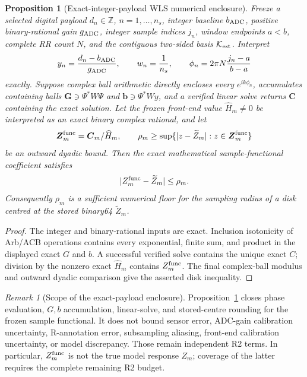 \documentclass[11pt]{article}
\newtheorem{proposition}[theorem]{Proposition}
\theoremstyle{definition}
\theoremstyle{remark}
\newtheorem{remark}[theorem]{Remark}
\newcommand{\Kset}{\mathcal K_{\rm est}}
\begin{document}
\begin{proposition}[Exact-integer-payload WLS numerical enclosure]
\label{prop:exact-payload-wls}
Freeze a selected digital payload \(d_n\in\mathbb Z\),
\(n=1,\ldots,n_s\), integer baseline
\(b_{\rm ADC}\), positive binary-rational gain \(g_{\rm ADC}\), integer sample
indices \(j_n\), window endpoints \(a<b\), complete RR count \(N\), and the
contiguous two-sided basis \(\Kset\).  Interpret
\[
 y_n=\frac{d_n-b_{\rm ADC}}{g_{\rm ADC}},\qquad
 w_n=\frac1{n_s},\qquad
 \phi_n=2\pi N\frac{j_n-a}{b-a}
\]
exactly.  Suppose complex ball arithmetic directly encloses every
\(e^{ik\phi_n}\), accumulates containing balls
\(\boldsymbol G\ni\Psi^*W\Psi\) and
\(\boldsymbol b\ni\Psi^*Wy\), and a verified linear solve returns
\(\boldsymbol C\) containing the exact solution.  Let the frozen front-end
value \(\widehat H_m\ne0\) be interpreted as an exact binary complex rational,
and let
\[
 \boldsymbol Z^{\rm func}_m=\boldsymbol C_m/\widehat H_m,\qquad
 \rho_m\ge\sup\{|z-\widetilde Z_m|:
 z\in\boldsymbol Z^{\rm func}_m\}
\]
be an outward dyadic bound.  Then the exact mathematical sample-functional
coefficient satisfies
\[
 |Z^{\rm func}_m-\widetilde Z_m|\le\rho_m.
\]
Consequently \(\rho_m\) is a sufficient numerical floor for the sampling
radius of a disk centred at the stored binary64 \(\widetilde Z_m\).
\end{proposition}
\begin{proof}
The integer and binary-rational inputs are exact.  Inclusion isotonicity of
Arb/ACB operations \cite{johansson2017} contains every exponential, finite
sum, and product in the
displayed exact \(G\) and \(b\).  A successful verified solve contains the
unique exact \(C\); division by the nonzero exact \(\widehat H_m\) contains
\(Z^{\rm func}_m\).  The final complex-ball modulus and outward dyadic comparison give
the asserted disk inequality.
\end{proof}

\begin{remark}[Scope of the exact-payload enclosure]
Proposition~\ref{prop:exact-payload-wls} closes phase evaluation,
\(G,b\) accumulation, linear-solve, and stored-centre rounding for the frozen
sample functional.  It does not bound sensor error, ADC-gain calibration
uncertainty, R-annotation error, subsampling aliasing, front-end calibration
uncertainty, or model discrepancy.  Those remain independent R2 terms.
In particular, \(Z^{\rm func}_m\) is not the true model response \(Z_m\);
coverage of the latter requires the complete remaining R2 budget.
\end{remark}
\end{document}
